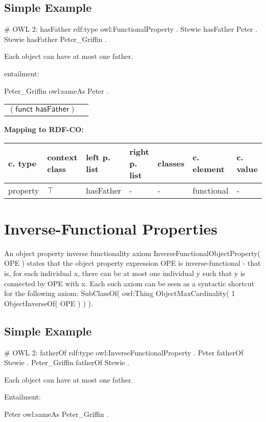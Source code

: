 \documentclass{llncs}
\newenvironment{gcotable}{
  \scriptsize
  \sffamily
  \vspace{0cm}
	\begin{center}
	\textbf{\vspace{0.4cm}Mapping to RDF-CO:} \\
  \begin{tabular}{l|l|l|l|l|l|l}
	\hline
  \textbf{c. type} & \textbf{context class} & \textbf{left p. list} & \textbf{right p. list} & \textbf{classes} & \textbf{c. element} & \textbf{c. value} \\
  \hline

}{
  \hline
  \end{tabular}
	\end{center}
}
\newenvironment{DL}{
  \vspace{0cm}
	\begin{center}
  \begin{tabular}{r l}

}{
  \end{tabular}
	\end{center}
}
\begin{document}
\subsection{Simple Example}

\begin{ex}
# OWL 2:
hasFather rdf:type owl:FunctionalProperty . 	
Stewie hasFather Peter . 	
Stewie hasFather Peter_Griffin . 
\end{ex}

Each object can have at most one father. 

entailment:

\begin{ex}
Peter_Griffin owl:sameAs Peter .  
\end{ex}

\begin{DL}
$(\textsf{funct } \textsf{hasFather})$
\end{DL}

\begin{gcotable}
property & $\top$ & hasFather & - & - & functional & - \\
\end{gcotable}

\section{Inverse-Functional Properties}

An object property inverse functionality axiom InverseFunctionalObjectProperty( OPE ) states that the object property expression OPE is inverse-functional - that is, for each individual x, there can be at most one individual y such that y is connected by OPE with x. Each such axiom can be seen as a syntactic shortcut for the following axiom: SubClassOf( owl:Thing ObjectMaxCardinality( 1 ObjectInverseOf( OPE ) ) ).

\subsection{Simple Example}

\begin{ex}
# OWL 2:
fatherOf rdf:type owl:InverseFunctionalProperty . 	
Peter fatherOf Stewie .
Peter_Griffin fatherOf Stewie .
\end{ex}

Each object can have at most one father. 

Entailment:

\begin{ex}
Peter owl:sameAs Peter_Griffin . 
\end{ex}
\end{document}
